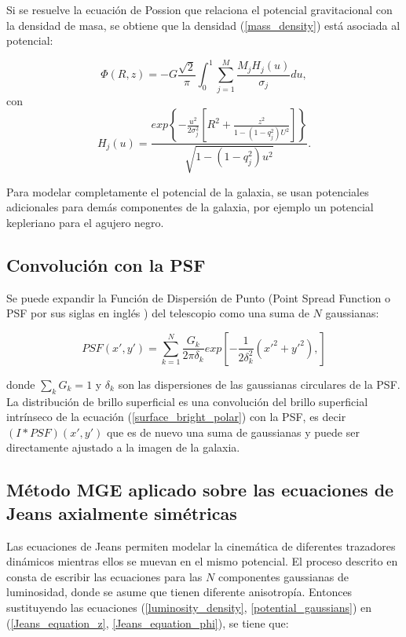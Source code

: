 Si se resuelve la ecuación de Possion que relaciona el potencial gravitacional con la densidad de masa, se obtiene que la densidad (\ref{mass_density}) está asociada al potencial:

\begin{equation}
\label{potential_gaussians}
\Phi(R, z) = - G \frac{\sqrt{2} }{\pi} \int_0^1 \sum_{j=1}^M \frac{M_j H_j(u)}{\sigma_j} du,
\end{equation}
con
\begin{equation}
H_j(u) = \frac{exp \left \{ -\frac{u^2}{2\sigma_j^2} \left[ R^2 + \frac{z^2}{1-(1-q_j^2)U^2} \right ] \right \}  }{ \sqrt{1-(1-q_j^2)u^2 } }.
\end{equation}

Para modelar completamente el potencial de la galaxia, se usan potenciales adicionales para demás componentes de la galaxia, por ejemplo un potencial kepleriano para el agujero negro.\\



\subsection{Convolución con la PSF}

Se puede expandir la Función de Dispersión de Punto  (Point Spread Function o PSF por sus siglas en inglés ) del telescopio como una suma de $N$ gaussianas:

\begin{equation}
PSF(x', y') = \sum_{k = 1}^N \frac{G_k}{2\pi \delta_k} exp \left[ -\frac{1}{2 \delta_k^2} \left( x'^2 + y'^2 \right), \right]
\end{equation}

donde $\sum_k G_k = 1$ y $\delta_k$ son las dispersiones de las gaussianas circulares de la PSF. La distribución de brillo superficial es una convolución del brillo superficial intrínseco de la ecuación (\ref{surface_bright_polar}) con la PSF, es decir $(I * PSF)(x', y')$ que es de nuevo una suma de gaussianas y puede ser directamente ajustado a la imagen de la galaxia.


\subsection{Método MGE aplicado sobre las ecuaciones de Jeans axialmente simétricas}

Las ecuaciones de Jeans permiten modelar la cinemática de diferentes trazadores dinámicos mientras ellos se muevan en el mismo potencial. El proceso descrito en \cite{2008MNRAS.390_71C} consta de escribir las ecuaciones para las $N$ componentes gaussianas de luminosidad, donde se asume que tienen diferente anisotropía. Entonces sustituyendo las ecuaciones (\ref{luminosity_density}, \ref{potential_gaussians}) en (\ref{Jeans_equation_z}, \ref{Jeans_equation_phi}), se tiene que:

